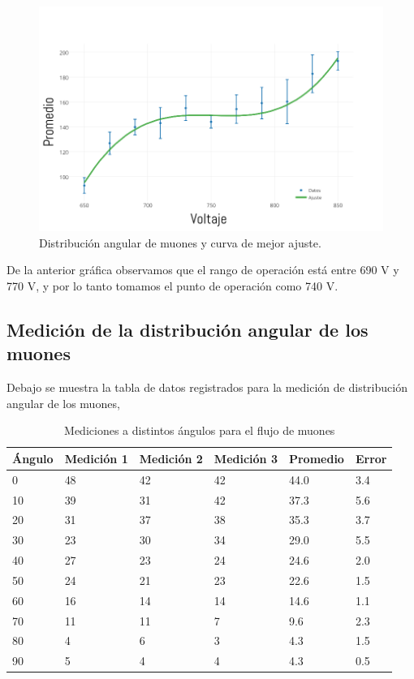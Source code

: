 \documentclass[a4paper,10pt]{article}
\numberwithin{equation}{section}
\begin{document}
\begin{figure}[H]
 \center 
 \includegraphics[scale=0.45]{atenuacionMuones1}
 \caption{Distribución angular de muones y curva de mejor ajuste.}
\end{figure}

De la anterior gráfica observamos que el rango de operación está entre 690 V y 770 V,
y por lo tanto tomamos el punto de operación como 740 V. 

\subsection{Medición de la distribución angular de los muones}

Debajo se muestra la tabla de datos registrados para la medición de distribución 
angular de los muones,

\begin{table}[H]
\centering
\caption{Mediciones a distintos ángulos para el flujo de muones}
\begin{tabular}{|l|l|l|l|l|l|}
\hline
Ángulo & Medición 1 & Medición 2 & Medición 3 & Promedio & Error \\ \hline
0      & 48        & 42        & 42        & 44.0     & 3.4   \\ \hline
10     & 39        & 31        & 42        & 37.3     & 5.6   \\ \hline
20     & 31        & 37        & 38        & 35.3     & 3.7   \\ \hline
30     & 23        & 30        & 34        & 29.0     & 5.5   \\ \hline
40     & 27        & 23        & 24        & 24.6     & 2.0   \\ \hline
50     & 24        & 21        & 23        & 22.6     & 1.5   \\ \hline
60     & 16        & 14        & 14        & 14.6     & 1.1   \\ \hline
70     & 11        & 11        & 7         & 9.6      & 2.3   \\ \hline
80     & 4         & 6         & 3         & 4.3      & 1.5   \\ \hline
90     & 5         & 4         & 4         & 4.3      & 0.5   \\ \hline
\end{tabular}
\end{table}
\end{document}
